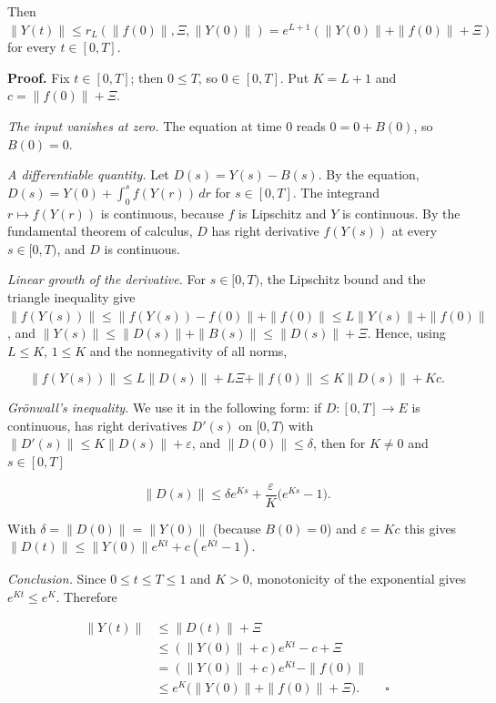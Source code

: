 \documentclass[11pt,a4paper]{report}
\begin{document}
Then \(\|Y(t)\|\le r_L(\|f(0)\|,\Xi,\|Y(0)\|)=e^{L+1}(\|Y(0)\|+\|f(0)\|+\Xi)\) for every \(t\in[0,T]\).




\textbf{Proof.} Fix \(t\in[0,T]\); then \(0\le T\), so \(0\in[0,T]\). Put \(K=L+1\) and \(c=\|f(0)\|+\Xi\).




\emph{The input vanishes at zero.} The equation at time \(0\) reads \(0=0+B(0)\), so \(B(0)=0\).




\emph{A differentiable quantity.} Let \(D(s)=Y(s)-B(s)\). By the equation, \(D(s)=Y(0)+\int_0^sf(Y(r))\,dr\) for \(s\in[0,T]\). The integrand \(r\mapsto f(Y(r))\) is continuous, because \(f\) is Lipschitz and \(Y\) is continuous. By the fundamental theorem of calculus, \(D\) has right derivative \(f(Y(s))\) at every \(s\in[0,T)\), and \(D\) is continuous.




\emph{Linear growth of the derivative.} For \(s\in[0,T)\), the Lipschitz bound and the triangle inequality give \(\|f(Y(s))\|\le\|f(Y(s))-f(0)\|+\|f(0)\|\le L\|Y(s)\|+\|f(0)\|\), and \(\|Y(s)\|\le\|D(s)\|+\|B(s)\|\le\|D(s)\|+\Xi\). Hence, using \(L\le K\), \(1\le K\) and the nonnegativity of all norms,


\[\|f(Y(s))\|\le L\|D(s)\|+L\Xi+\|f(0)\|\le K\|D(s)\|+Kc .\]


\emph{Grönwall's inequality.} We use it in the following form: if \(D:[0,T]\to E\) is continuous, has right derivatives \(D'(s)\) on \([0,T)\) with \(\|D'(s)\|\le K\|D(s)\|+\varepsilon\), and \(\|D(0)\|\le\delta\), then for \(K\ne0\) and \(s\in[0,T]\)


\[\|D(s)\|\le\delta e^{Ks}+\frac{\varepsilon}{K}\bigl(e^{Ks}-1\bigr).\]


With \(\delta=\|D(0)\|=\|Y(0)\|\) (because \(B(0)=0\)) and \(\varepsilon=Kc\) this gives \(\|D(t)\|\le\|Y(0)\|e^{Kt}+c(e^{Kt}-1)\).




\emph{Conclusion.} Since \(0\le t\le T\le1\) and \(K>0\), monotonicity of the exponential gives \(e^{Kt}\le e^K\). Therefore


\[\begin{aligned}\|Y(t)\|&\le\|D(t)\|+\Xi\\&\le(\|Y(0)\|+c)e^{Kt}-c+\Xi\\&=(\|Y(0)\|+c)e^{Kt}-\|f(0)\|\\&\le e^{K}\bigl(\|Y(0)\|+\|f(0)\|+\Xi\bigr).\qquad\square\end{aligned}\]
\end{document}
